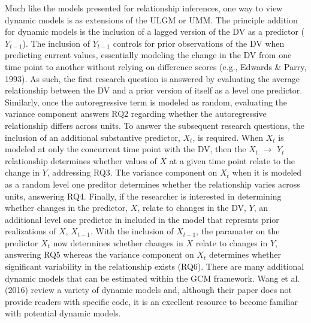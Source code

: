 \documentclass[english,,man]{apa6}
\theoremstyle{definition}
\theoremstyle{definition}
\theoremstyle{definition}
\theoremstyle{remark}
\begin{document}
Much like the models presented for relationship inferences, one way to
view dynamic models is as extensions of the ULGM or UMM. The principle
addition for dynamic models is the inclusion of a lagged version of the
DV as a predictor (\(Y_{t-1}\)). The inclusion of \(Y_{t-1}\) controls
for prior observations of the DV when predicting current values,
essentially modeling the change in the DV from one time point to another
without relying on difference scores (e.g., Edwards \& Parry, 1993). As
such, the first research question is answered by evaluating the average
relationship between the DV and a prior version of itself as a level one
predictor. Similarly, once the autoregressive term is modeled as random,
evaluating the variance component answers RQ2 regarding whether the
autoregressive relationship differs across units. To answer the
subsequent research questions, the inclusion of an additional
substantive predictor, \(X_t\), is required. When \(X_t\) is modeled at
only the concurrent time point with the DV, then the \(X_t\)
\(\rightarrow\) \(Y_t\) relationship determines whether values of \(X\)
at a given time point relate to the change in \(Y\), addressing RQ3. The
variance component on \(X_t\) when it is modeled as a random level one
preditor determines whether the relationship varies across units,
answering RQ4. Finally, if the researcher is interested in determining
whether changes in the predictor, \(X\), relate to changes in the DV,
\(Y\), an additional level one predictor in included in the model that
represnts prior realizations of \(X\), \(X_{t-1}\). With the inclusion
of \(X_{t-1}\), the paramater on the predictor \(X_t\) now determines
whether changes in \(X\) relate to changes in \(Y\), answering RQ5
whereas the variance component on \(X_t\) determines whether significant
variability in the relationship exists (RQ6). There are many additional
dynamic models that can be estimated within the GCM framework. Wang et
al. (2016) review a variety of dynamic models and, although their paper
does not provide readers with specific code, it is an excellent resource
to become familiar with potential dynamic models.
\end{document}
